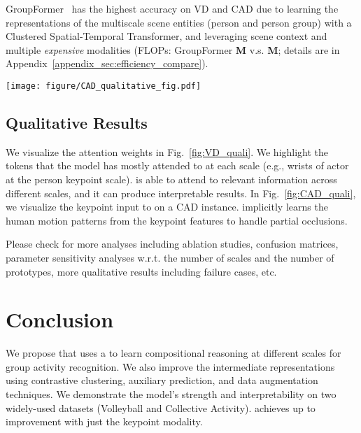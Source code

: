 \documentclass[runningheads]{llncs}
\begin{document}
GroupFormer~\cite{GroupFormer} has the highest accuracy on VD and CAD due to learning the representations of the multiscale scene entities (person and person group) with a Clustered Spatial-Temporal Transformer, and leveraging scene context and multiple \textit{expensive} modalities (FLOPs: GroupFormer \textbf{M} v.s.  \ours \textbf{M}; details are in Appendix~\ref{appendix_sec:efficiency_compare}).
 

\begin{figure*}
\centering
\texttt{[image: figure/CAD\_qualitative\_fig.pdf]}
\caption{\textbf{Qualitative results on CAD} (video ID `10'). \ours successfully predicts `Queueing' even when the input keypoints are partially noisy due to occlusion.}
\label{fig:CAD_quali}
\end{figure*}
  
 
\subsection{Qualitative Results}
\label{section:quali}  

We visualize the attention weights in Fig.~\ref{fig:VD_quali}. We highlight the tokens that the model has mostly attended to at each scale (e.g., wrists of actor  at the person keypoint scale). \ours is able to attend to relevant information across different scales, and it can produce interpretable results. 
In Fig.~\ref{fig:CAD_quali}, we visualize the keypoint input to \ours on a CAD instance. 
\ours implicitly learns the human motion patterns from the keypoint features to handle partial occlusions.


Please  check \APP for more analyses including ablation studies, confusion matrices, parameter sensitivity analyses w.r.t. the number of scales and the number of prototypes, more qualitative results including failure cases, etc. 







 
 
 

\section{Conclusion}
\label{sec:conclusion}

 
We propose \ours that uses a \mtx to learn compositional reasoning at different scales for group activity recognition. 
We also improve the intermediate representations using contrastive clustering, auxiliary prediction, and data augmentation techniques.
We demonstrate the model's strength and interpretability on two widely-used datasets (Volleyball and Collective Activity).  
\ours achieves up to  improvement with just the keypoint modality. 
\end{document}
